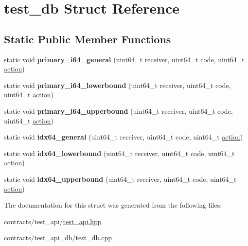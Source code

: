 \hypertarget{structtest__db}{}\section{test\+\_\+db Struct Reference}
\label{structtest__db}
\subsection*{Static Public Member Functions}
\begin{DoxyCompactItemize}
\item 
\mbox{\label{structtest__db_a872993979655083e6966f3c02f1b5b38}} 
static void {\bfseries primary\+\_\+i64\+\_\+general} (uint64\+\_\+t receiver, uint64\+\_\+t code, uint64\+\_\+t \mbox{\hyperlink{structaction}{action}})
\item 
\mbox{\label{structtest__db_a22fe8851275282f6b52570ee75d4e10e}} 
static void {\bfseries primary\+\_\+i64\+\_\+lowerbound} (uint64\+\_\+t receiver, uint64\+\_\+t code, uint64\+\_\+t \mbox{\hyperlink{structaction}{action}})
\item 
\mbox{\label{structtest__db_ab3ae51aef62b9f74a7da7084499b3478}} 
static void {\bfseries primary\+\_\+i64\+\_\+upperbound} (uint64\+\_\+t receiver, uint64\+\_\+t code, uint64\+\_\+t \mbox{\hyperlink{structaction}{action}})
\item 
\mbox{\label{structtest__db_ad2a7eb49fed9e305298915df48570358}} 
static void {\bfseries idx64\+\_\+general} (uint64\+\_\+t receiver, uint64\+\_\+t code, uint64\+\_\+t \mbox{\hyperlink{structaction}{action}})
\item 
\mbox{\label{structtest__db_af3d03189605698b4d87833c9f2635fdf}} 
static void {\bfseries idx64\+\_\+lowerbound} (uint64\+\_\+t receiver, uint64\+\_\+t code, uint64\+\_\+t \mbox{\hyperlink{structaction}{action}})
\item 
\mbox{\label{structtest__db_af20dd30db73f2f7a9f1dae3f9766ba68}} 
static void {\bfseries idx64\+\_\+upperbound} (uint64\+\_\+t receiver, uint64\+\_\+t code, uint64\+\_\+t \mbox{\hyperlink{structaction}{action}})
\end{DoxyCompactItemize}


The documentation for this struct was generated from the following files\+:\begin{DoxyCompactItemize}
\item 
contracts/test\+\_\+api/\mbox{\hyperlink{test__api_8hpp}{test\+\_\+api.\+hpp}}\item 
contracts/test\+\_\+api\+\_\+db/test\+\_\+db.\+cpp\end{DoxyCompactItemize}
